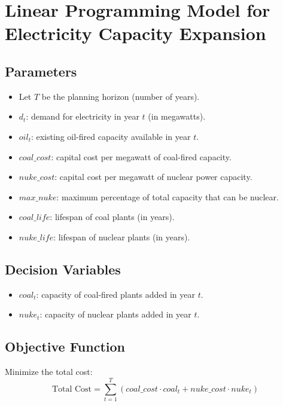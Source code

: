 \documentclass{article}
\begin{document}
\section*{Linear Programming Model for Electricity Capacity Expansion}

\subsection*{Parameters}
\begin{itemize}
    \item Let \( T \) be the planning horizon (number of years).
    \item \( d_t \): demand for electricity in year \( t \) (in megawatts).
    \item \( oil_t \): existing oil-fired capacity available in year \( t \).
    \item \( coal\_cost \): capital cost per megawatt of coal-fired capacity.
    \item \( nuke\_cost \): capital cost per megawatt of nuclear power capacity.
    \item \( max\_nuke \): maximum percentage of total capacity that can be nuclear.
    \item \( coal\_life \): lifespan of coal plants (in years).
    \item \( nuke\_life \): lifespan of nuclear plants (in years).
\end{itemize}

\subsection*{Decision Variables}
\begin{itemize}
    \item \( coal_t \): capacity of coal-fired plants added in year \( t \).
    \item \( nuke_t \): capacity of nuclear plants added in year \( t \).
\end{itemize}

\subsection*{Objective Function}
Minimize the total cost:
\[
\text{Total Cost} = \sum_{t=1}^{T} (coal\_cost \cdot coal_t + nuke\_cost \cdot nuke_t)
\]
\end{document}
